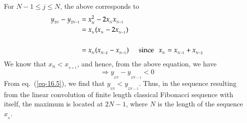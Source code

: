 \begin{multicols}{2}
For\hspace{0.1in} $N-1 \leq j \leq N$,\hspace{0.1in} the above corresponds to
\begin{align}
y_{_{2N}} - y_{_{2N-1}} &= x_{_N}^2 - 2x_{_N}x_{_{N-1}}\label{eq-16.4}\\
&= x_{_N}(x_{_N} - 2x_{_{N-1}})\nonumber\\~\nonumber\\
&= x_{_N}(x_{_{N-2}}-x_{_{N-1}})\hspace{0.2in}\textup{since}\hspace{0.1in} x_{_N} = x_{_{N-1}} + x_{_{N-2}}\nonumber
\end{align} 
We know that \hspace{0.1in} $x_{{n}} < x_{_{n+1}}$, \hspace{0.1in} and hence, from the above equation, we have
\begin{equation}
\Rightarrow y_{_{2N}} - y_{_{2N-1}}< 0 \label{eq-16.5}
\end{equation}
From eq.~(\ref{eq-16.5}), we find that $y_{_{2N}} < y_{_{2N-1}}$. Thus, in the sequence resulting from the linear convolution of finite length classical Fibonacci sequence with itself, the maximum is located at $2N-1$, where $N$ is the length of the sequence $x_{_n}$.


\end{multicols}
